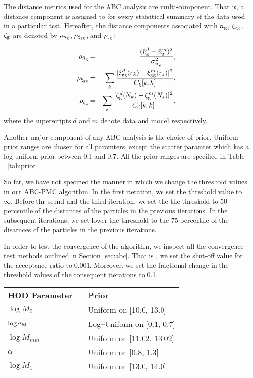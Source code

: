 \documentclass[12pt, preprint]{aastex}
\begin{document}
The distance metrics used for the ABC analysis are multi-component. That is, a distance component is assigned to for every statsitical summary of the data used in a particular test. Hereafter, the distance components associated with $\bar{n}_{\mathrm{g}}$, $\xi_{\mathrm{gg}}$, $\mathcal{\zeta}_{\rm g}$ are denoted by $\rho_{\bar{n}_{\mathrm{g}}}$, $\rho_{\xi_{\mathrm{gg}}}$, and $\rho_{\mathcal{\zeta}_{\rm g}}$:

\begin{eqnarray}
\rho_{\bar{n}_{\mathrm{g}}} &=& \frac{(\bar{n}_{\mathrm{g}}^{d} - \bar{n}_{\mathrm{g}}^{m})^{2}}{\sigma^{2}_{\bar{n}_{\mathrm{g}}}},\\
\rho_{\xi_{\mathrm{gg}}}    &=& \sum_{k} \frac{[\xi_{\mathrm{gg}}^{d}(r_k) - \xi_{\mathrm{gg}}^{m}(r_k)]^{2}}{C_{\xi}[k,k]},\\
\rho_{\mathcal{\zeta}_{\rm g}}     &=& \sum_{k} \frac{[\mathcal{\zeta}_{\rm g}^{d}(N_k) - \mathcal{\zeta}_{\rm g}^{m}(N_k)]^{2}}{C_{\zeta}[k,k]},
\end{eqnarray}
where the superscripts $d$ and $m$ denote data and model respectively.

Another major component of any ABC analysis is the choice of prior. Uniform prior ranges are chosen for all paramters, except the scatter paramter which has a log-uniform prior between 0.1 and 0.7. All the prior ranges are specified in Table ~\ref{tab:prior}.

So far, we have not specified the manner in which we change the threshold values in our ABC-PMC algorithm. 
In the first iteration, we set the threshold value to $\infty$. Before thr seond and the third iteration, we set the the threshold to 50-percentile of the distances of the particles in the previous iterations. In the subsequent iterations, we set lower the threshold to the 75-percentile of the disatnces of the particles in the previous iterations.

In order to test the convergence of the algorithm, we inspect all the convergence test methods outlined in Section \ref{sec:abc}. That is , we set the shut-off value for the acceptence ratio to 0.001. Moreover, we set the fractional change in the threshold values of the consequent iterations to 0.1.



\begin{table*}
  \label{tab:prior}
  \caption{{\bf Prior Specifications}. Priors that contain the form [a, b] mean the
parameter in question is restricted to values within that range. All mass parameters are in unit of $h^{-1}M_\sun$}
\begin{tabular}{@{}lll}
\\ \hline \hline
    HOD Parameter & & Prior \\ \hline
   $\log M_{0}$   & & Uniform on [10.0, 13.0] \\
  $\log \sigma_{\rm M}$ & & Log--Uniform on [0.1, 0.7] \\
  $\log M_{min}$ & &   Uniform on [11.02, 13.02] \\
  $\alpha$ & & Uniform on [0.8, 1.3] \\
  $\log M_{1}$ & & Uniform on [13.0, 14.0] \\
 \hline
  \end{tabular}
\end{table*}
\end{document}
